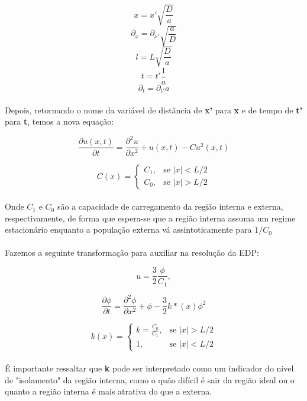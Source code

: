 \documentclass{article}
\begin{document}
	$$ x = x' \sqrt{\frac{D}{a}} $$
	$$ \partial_x = \partial_{x'} \sqrt{\frac{a}{D}} $$
	$$l = L \sqrt{\frac{D}{a}}$$
	$$t = t' \frac{1}{a}$$
	$$\partial_t = \partial_{t'}a$$
	
	\paragraph{}
	Depois, retornando o nome da variável de distância de \textbf{x'} para \textbf{x} e de tempo de \textbf{t'} para \textbf{t}, temos a nova equação:
	
	$$ \frac{\partial u(x,t)}{\partial t} =  \frac{\partial^2 u}{\partial x^2} + u(x,t) - C u^2(x,t)   $$
	
	$$ C(x) =  \begin{cases}
		C_1, & \text{se } |x| < L/2 \\
		C_0, & \text{se } |x| > L/2
	\end{cases}$$
	
	\paragraph{}
	Onde $C_1$ e $C_0$ são a capacidade de carregamento da região interna e externa, respectivamente, de forma que espera-se que a região interna assuma um regime estacionário enquanto a população externa vá assintoticamente para $1/C_0$
	
	\paragraph{}
	Fazemos a seguinte transformação para auxiliar na resolução da EDP:
	
	$$ u = \frac{3}{2} \frac{\phi}{C_1}, $$
	
	$$ \frac{\partial \phi}{\partial t} = \frac{\partial^2\phi }{\partial x^2} + \phi - \frac{3}{2} k*(x)\phi^2 $$
	
	$$ k(x) =  \begin{cases}
		k = \frac{C_0}{C_1}, & \text{se } |x| > L/2 \\
		1, & \text{se } |x| < L/2
	\end{cases}$$
	
	\paragraph{}
	É importante ressaltar que \textbf{k} pode ser interpretado como um indicador do nível de "isolamento" da região interna, como o quão difícil é sair da região ideal ou o quanto a região interna é mais atrativa do que a externa.
	
\end{document}
